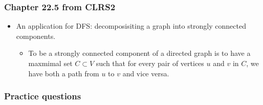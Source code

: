 \documentclass[a4paper,11pt]{article}
\begin{document}
\subsubsection{Chapter 22.5 from CLRS2}\label{chapter-22.5-from-clrs2}

\begin{itemize}
\itemsep1pt\parskip0pt
\item
  An application for DFS: decomposisiting a graph into strongly
  connected components.

  \begin{itemize}
  \itemsep1pt\parskip0pt
  \item
    To be a strongly connected component of a directed graph is to have
    a maxmimal set $C \subset V$ such that for every pair of vertices
    $u$ and $v$ in $C$, we have both a path from $u$ to $v$ and vice
    versa.
  \end{itemize}
\end{itemize}

\subsubsection{Practice questions}\label{practice-questions-12}
\end{document}
